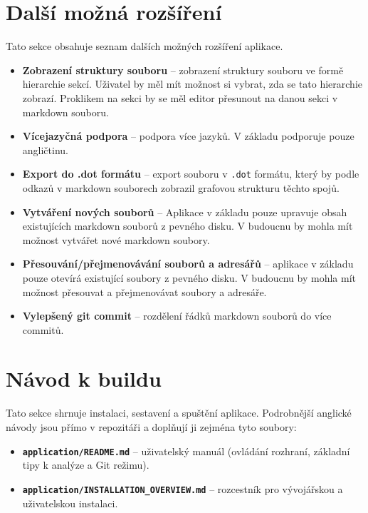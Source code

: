 \documentclass[12pt, a4paper]{article}
\begin{document}
\section{Další možná rozšíření}

Tato sekce obsahuje seznam dalších možných rozšíření aplikace.

\begin{itemize}
    \item \textbf{Zobrazení struktury souboru} -- zobrazení struktury 
    souboru ve formě hierarchie sekcí. Uživatel by měl mít možnost si vybrat, zda se tato hierarchie zobrazí.
    Proklikem na sekci by se měl editor přesunout na danou sekci v markdown souboru.
    \item \textbf{Vícejazyčná podpora} -- podpora více jazyků. V základu podporuje pouze angličtinu.
    \item \textbf{Export do .dot formátu} -- export souboru v \texttt{.dot} formátu,
    který by podle odkazů v markdown souborech zobrazil grafovou strukturu těchto spojů.
    \item \textbf{Vytváření nových souborů} -- Aplikace v základu pouze upravuje obsah existujících markdown souborů z pevného disku.
    V budoucnu by mohla mít možnost vytvářet nové markdown soubory.
    \item \textbf{Přesouvání/přejmenovávání souborů a adresářů} -- aplikace v základu pouze otevírá existující soubory z pevného disku.
    V budoucnu by mohla mít možnost přesouvat a přejmenovávat soubory a adresáře.
    \item \textbf{Vylepšený git commit} -- rozdělení řádků markdown souborů do více commitů.
\end{itemize}

\section{Návod k buildu}

Tato sekce shrnuje instalaci, sestavení a spuštění aplikace. Podrobnější anglické návody jsou přímo v repozitáři a doplňují ji zejména tyto soubory:

\begin{itemize}
    \item \textbf{\texttt{application/README.md}} -- uživatelský manuál (ovládání rozhraní, základní tipy k analýze a Git režimu).
    \item \textbf{\texttt{application/INSTALLATION\_OVERVIEW.md}} -- rozcestník pro vývojářskou a uživatelskou instalaci.
\end{itemize}
\end{document}
